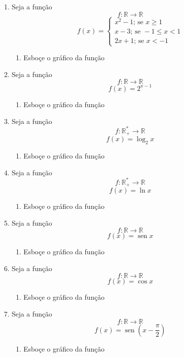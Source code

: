 \documentclass[a4paper, 12pt]{article}
\DeclareMathOperator{\sen}{sen}
\begin{document}
 
\begin{enumerate}
 \item Seja a função $$f : \mathbb{R} \to \mathbb{R}$$
 $$f(x) = 
 \begin{cases}
  x^2 - 1;\, \textrm{se } x \geq 1 \\
  x - 3;\, \textrm{se } -1 \leq x < 1 \\
  2x + 1;\, \textrm{se } x < -1
 \end{cases}
 $$
 \begin{enumerate}
  \item Esboçe o gráfico da função
 \end{enumerate}
 
 \item Seja a função $$f : \mathbb{R} \to \mathbb{R}$$
 $$f(x) = 2^{x-1}$$
 \begin{enumerate}
  \item Esboçe o gráfico da função
 \end{enumerate}
 
 \item Seja a função $$f : \mathbb{R}^*_+ \to \mathbb{R}$$
 $$f(x) = \log_2 x$$
 \begin{enumerate}
  \item Esboçe o gráfico da função
 \end{enumerate}
 
 \item Seja a função $$f : \mathbb{R}^*_+ \to \mathbb{R}$$
 $$f(x) = \ln x$$
 \begin{enumerate}
  \item Esboçe o gráfico da função
 \end{enumerate}
 
 \item Seja a função $$f : \mathbb{R} \to \mathbb{R}$$
 $$f(x) = \sen x$$
 \begin{enumerate}
  \item Esboçe o gráfico da função
 \end{enumerate} 
 
 \item Seja a função $$f : \mathbb{R} \to \mathbb{R}$$
 $$f(x) = \cos x$$
 \begin{enumerate}
  \item Esboçe o gráfico da função
 \end{enumerate}
 
 \item Seja a função $$f : \mathbb{R} \to \mathbb{R}$$
 $$f(x) = \sen \left(x - \frac{\pi}{2}\right)$$
 \begin{enumerate}
  \item Esboçe o gráfico da função
 \end{enumerate}
 
\end{enumerate}
 
\end{document}
